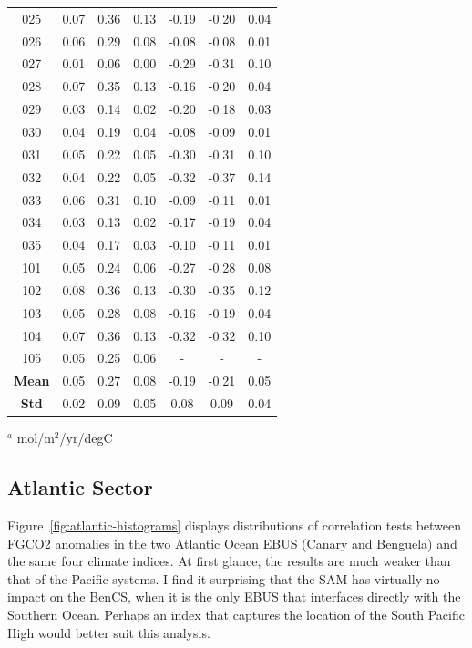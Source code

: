 \documentclass[12pt]{article}
\begin{document}
\begin{table}[!h]
\begin{tabular}{c c c c | c c c}
		025 &   0.07 &     0.36 &       0.13 &  -0.19 &    -0.20 &       0.04 \\
		026 &   0.06 &     0.29 &       0.08 &  -0.08 &    -0.08 &       0.01 \\
		027 &   0.01 &     0.06 &       0.00 &  -0.29 &    -0.31 &       0.10 \\
		028 &   0.07 &     0.35 &       0.13 &  -0.16 &    -0.20 &       0.04 \\
		029 &   0.03 &     0.14 &       0.02 &  -0.20 &    -0.18 &       0.03 \\
		030 &   0.04 &     0.19 &       0.04 &  -0.08 &    -0.09 &       0.01 \\
		031 &   0.05 &     0.22 &       0.05 &  -0.30 &    -0.31 &       0.10 \\
		032 &   0.04 &     0.22 &       0.05 &  -0.32 &    -0.37 &       0.14 \\
		033 &   0.06 &     0.31 &       0.10 &  -0.09 &    -0.11 &       0.01 \\
		034 &   0.03 &     0.13 &       0.02 &  -0.17 &    -0.19 &       0.04 \\
		035 &   0.04 &     0.17 &       0.03 &  -0.10 &    -0.11 &       0.01 \\
		101 &   0.05 &     0.24 &       0.06 &  -0.27 &    -0.28 &       0.08 \\
		102 &   0.08 &     0.36 &       0.13 &  -0.30 &    -0.35 &       0.12 \\
		103 &   0.05 &     0.28 &       0.08 &  -0.16 &    -0.19 &       0.04 \\
		104 &   0.07 &     0.36 &       0.13 &  -0.32 &    -0.32 &       0.10 \\
		105 &   0.05 &     0.25 &       0.06 &    - &      - &        - \\
		\bottomrule
		\textbf{Mean} & 0.05 & 0.27 & 0.08 & -0.19 & -0.21 & 0.05 \\
		\textbf{Std} & 0.02 & 0.09 & 0.05 & 0.08 & 0.09 & 0.04
	\end{tabular}
	\begin{tablenotes}
		\centering
		\item $^{a}$ mol/m$^{2}$/yr/degC
	\end{tablenotes}
	\label{tab:pdo-pacific}
\end{table}
\clearpage
\subsection{Atlantic Sector}
Figure~\ref{fig:atlantic-histograms} displays distributions of correlation tests between FGCO2 anomalies in the two Atlantic Ocean EBUS (Canary and Benguela) and the same four climate indices. At first glance, the results are much weaker than that of the Pacific systems. I find it surprising that the SAM has virtually no impact on the BenCS, when it is the only EBUS that interfaces directly with the Southern Ocean. Perhaps an index that captures the location of the South Pacific High would better suit this analysis. \\
\end{document}
